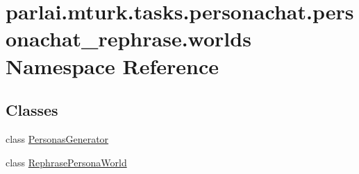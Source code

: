 \hypertarget{namespaceparlai_1_1mturk_1_1tasks_1_1personachat_1_1personachat__rephrase_1_1worlds}{}\section{parlai.\+mturk.\+tasks.\+personachat.\+personachat\+\_\+rephrase.\+worlds Namespace Reference}
\label{namespaceparlai_1_1mturk_1_1tasks_1_1personachat_1_1personachat__rephrase_1_1worlds}
\subsection*{Classes}
\begin{DoxyCompactItemize}
\item 
class \hyperlink{classparlai_1_1mturk_1_1tasks_1_1personachat_1_1personachat__rephrase_1_1worlds_1_1PersonasGenerator}{Personas\+Generator}
\item 
class \hyperlink{classparlai_1_1mturk_1_1tasks_1_1personachat_1_1personachat__rephrase_1_1worlds_1_1RephrasePersonaWorld}{Rephrase\+Persona\+World}
\end{DoxyCompactItemize}
